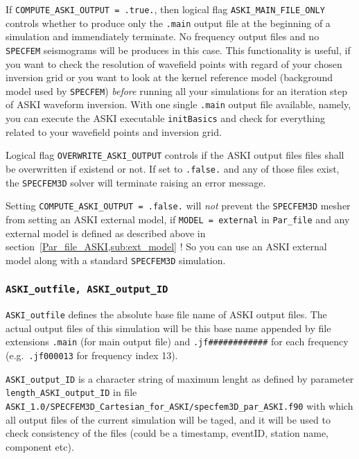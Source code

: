 \documentclass[12pt,a4paper]{article}
\newcommand{\lcode}[1]{\nolinkurl{#1}}
\newcommand{\ASKI}{ {\ttfamily ASKI} }
\begin{document}
If \lcode{COMPUTE_ASKI_OUTPUT = .true.}, then logical flag \lcode{ASKI_MAIN_FILE_ONLY} controls whether to
produce only the \lcode{.main} output file at the beginning of a simulation and immendiately terminate. No
frequency output files and no \lcode{SPECFEM} seismograms will be produces in this case. This functionality
is useful, if you want to check the resolution of wavefield points with regard of your chosen inversion grid 
or you want to look at the kernel reference model (background model used by \lcode{SPECFEM}) \emph{before}
running all your simulations for an iteration step of \ASKI waveform inversion. With one single \lcode{.main}
output file available, namely, you can execute the \ASKI executable \lcode{initBasics} and check for everything
related to your wavefield points and inversion grid.

Logical flag \lcode{OVERWRITE_ASKI_OUTPUT} controls if the \ASKI output files files shall be overwritten if 
existend or not. If set to \lcode{.false.} and any of those files exist, the \lcode{SPECFEM3D} solver will 
terminate raising an error message.

Setting \lcode{COMPUTE_ASKI_OUTPUT = .false.} will \emph{not} prevent the \lcode{SPECFEM3D} mesher from
setting an \ASKI external model, if \lcode{MODEL = external} in \lcode{Par_file} and any external
model is defined as described above in section~\ref{Par_file_ASKI,sub:ext_model}{} ! So you can
use an \ASKI external model along with a standard \lcode{SPECFEM3D} simulation.

\subsubsection*{\lcode{ASKI_outfile, ASKI_output_ID}}
\lcode{ASKI_outfile} defines the absolute base file name of \ASKI output files.
The actual output files of this simulation will be this base name appended by file extensions
\lcode{.main} (for main output file) and \lcode{.jf############} for each frequency (e.g.\ \lcode{.jf000013} for 
frequency index 13).

\lcode{ASKI_output_ID} is a character
string of maximum lenght as defined by parameter \lcode{length_ASKI_output_ID} in file\\
\lcode{ASKI_1.0/SPECFEM3D_Cartesian_for_ASKI/specfem3D_par_ASKI.f90} 
with which all output files of the current simulation will be taged, and it will be used to check consistency 
of the files (could be a timestamp, eventID, station name, component etc).
\end{document}
